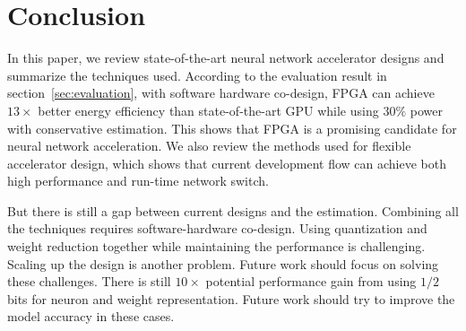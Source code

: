 \section{Conclusion}\label{sec:conclusion}

In this paper, we review state-of-the-art neural network accelerator designs and summarize the techniques used. According to the evaluation result in section~\ref{sec:evaluation}, with software hardware co-design, FPGA can achieve $13\times$ better energy efficiency than state-of-the-art GPU while using $30\%$ power with conservative estimation. This shows that FPGA is a promising candidate for neural network acceleration. We also review the methods used for flexible accelerator design, which shows that current development flow can achieve both high performance and run-time network switch.

But there is still a gap between current designs and the estimation. Combining all the techniques requires software-hardware co-design. Using quantization and weight reduction together while maintaining the performance is challenging. Scaling up the design is another problem. Future work should focus on solving these challenges. There is still $10\times$ potential performance gain from using $1/2$ bits for neuron and weight representation. Future work should try to improve the model accuracy in these cases.